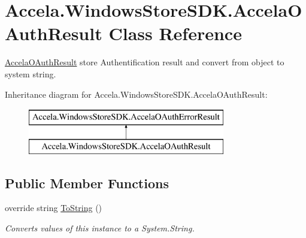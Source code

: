 \hypertarget{class_accela_1_1_windows_store_s_d_k_1_1_accela_o_auth_result}{\section{Accela.\+Windows\+Store\+S\+D\+K.\+Accela\+O\+Auth\+Result Class Reference}
\label{class_accela_1_1_windows_store_s_d_k_1_1_accela_o_auth_result}
}


\hyperlink{class_accela_1_1_windows_store_s_d_k_1_1_accela_o_auth_result}{Accela\+O\+Auth\+Result} store Authentification result and convert from object to system string.  


Inheritance diagram for Accela.\+Windows\+Store\+S\+D\+K.\+Accela\+O\+Auth\+Result\+:\begin{figure}[H]
\begin{center}
\leavevmode
\includegraphics[height=2.000000cm]{class_accela_1_1_windows_store_s_d_k_1_1_accela_o_auth_result}
\end{center}
\end{figure}
\subsection*{Public Member Functions}
\begin{DoxyCompactItemize}
\item 
override string \hyperlink{class_accela_1_1_windows_store_s_d_k_1_1_accela_o_auth_result_a379c1d248de1f1b7643899b3087ece5b}{To\+String} ()
\begin{DoxyCompactList}\small\item\em Converts values of this instance to a System.\+String. \end{DoxyCompactList}\end{DoxyCompactItemize}
